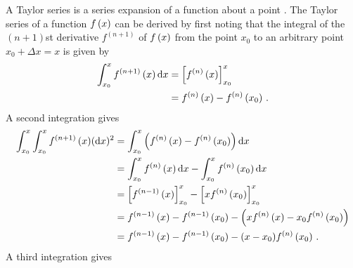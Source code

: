 A Taylor series is a series expansion of a function about a point \parencite{Weisstein2017}.
The Taylor series of a function $f\del{ x }$ can be derived by first noting that the integral of the $(n+1)$st derivative $f^{(n+1)}$ of $f\del{ x }$ from the point $x_0$ to an arbitrary point $x_0 + \Delta x = x$ is given by
\begin{align*}
  \int_{x_0}^x{f^{(n+1)}\del{ x }}\dif x &= \sbr{ f^{(n)}\del{ x } }_{x_0}^x \\
                               &= f^{(n)}\del{ x } - f^{(n)}\del{ x_0 } \, .
\end{align*}
A second integration gives
\begin{align*}
  \int_{x_0}^x\int_{x_0}^x{f^{(n+1)}\del{ x }} (\dif x)^2 &= \int_{x_0}^x{\del{ f^{(n)}\del{ x } - f^{(n)}\del{ x_0 } }}\dif x \\
                                    &= \int_{x_0}^x{f^{(n)}\del{ x }}\dif x - \int_{x_0}^x{f^{(n)}\del{ x_0 }}\dif x \\
                                    &= \sbr{ f^{(n-1)}\del{ x } }_{x_0}^x - \sbr{ x f^{(n)}\del{ x_0 } }_{x_0}^x \\
                                    &= f^{(n-1)}\del{ x } - f^{(n-1)}\del{ x_0 } - \del{ x f^{(n)}\del{ x } - x_0 f^{(n)}\del{ x_0 } } \\
                                    &= f^{(n-1)}\del{ x } - f^{(n-1)}\del{ x_0 } - (x - x_0) f^{(n)}\del{ x_0 } \, .
\end{align*}
A third integration gives
